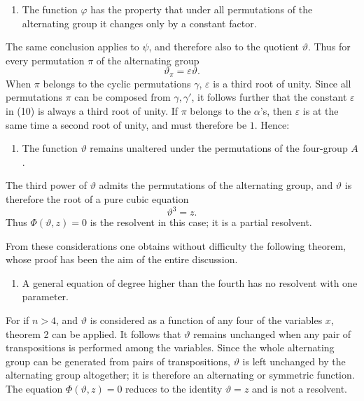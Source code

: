 \documentclass[11pt]{article}
\begin{document}
\begin{enumerate}[label=\arabic*.]
\item The function \(\varphi\) has the property that under all permutations of the alternating group it changes only by a constant factor.
\end{enumerate}

The same conclusion applies to \(\psi\), and therefore also to the quotient \(\vartheta\). Thus for every permutation \(\pi\) of the alternating group
\begin{equation}
\vartheta_\pi=\varepsilon\vartheta.
\tag{10}
\end{equation}
When \(\pi\) belongs to the cyclic permutations \(\gamma\), \(\varepsilon\) is a third root of unity. Since all permutations \(\pi\) can be composed from \(\gamma,\gamma'\), it follows further that the constant \(\varepsilon\) in (10) is always a third root of unity. If \(\pi\) belongs to the \(\alpha\)'s, then \(\varepsilon\) is at the same time a second root of unity, and must therefore be \(1\). Hence:

\begin{enumerate}[label=\arabic*.,start=2]
\item The function \(\vartheta\) remains unaltered under the permutations of the four-group \(A\).
\end{enumerate}

The third power of \(\vartheta\) admits the permutations of the alternating group, and \(\vartheta\) is therefore the root of a pure cubic equation
\[
\vartheta^3=z.
\]
Thus \(\Phi(\vartheta,z)=0\) is the resolvent in this case; it is a partial resolvent.

From these considerations one obtains without difficulty the following theorem, whose proof has been the aim of the entire discussion.

\begin{enumerate}[label=\arabic*.,start=3]
\item A general equation of degree higher than the fourth has no resolvent with one parameter.
\end{enumerate}

For if \(n>4\), and \(\vartheta\) is considered as a function of any four of the variables \(x\), theorem 2 can be applied. It follows that \(\vartheta\) remains unchanged when any pair of transpositions is performed among the variables. Since the whole alternating group can be generated from pairs of transpositions, \(\vartheta\) is left unchanged by the alternating group altogether; it is therefore an alternating or symmetric function. The equation \(\Phi(\vartheta,z)=0\) reduces to the identity \(\vartheta=z\) and is not a resolvent.
\end{document}
